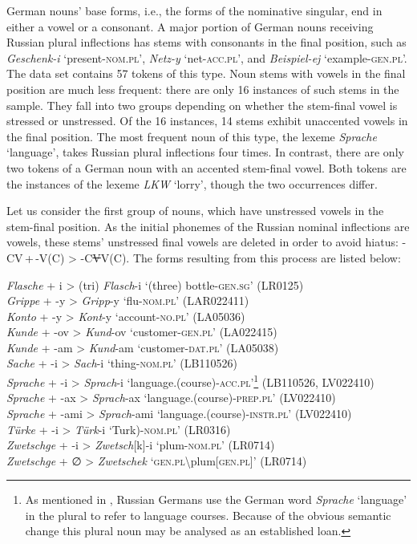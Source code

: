 \begin{sloppypar}
German nouns’ base forms, i.e., the forms of the nominative singular, end in either a vowel or a consonant. A major portion of German nouns receiving Russian plural inflections has stems with consonants in the final position, such as \textit{Geschenk-i} `present-\textsc{nom.pl}', \textit{Netz-y} `net-\textsc{acc.pl}', and \textit{Beispiel-ej} `example-\textsc{gen.pl}'. The data set contains 57 tokens of this type. Noun stems with vowels in the final position are much less frequent: there are only 16 instances of such stems in the sample. They fall into two groups depending on whether the stem-final vowel is  stressed or unstressed. Of the 16 instances, 14 stems exhibit unaccented vowels in the final  position. The most frequent noun of this type, the lexeme \textit{Sprache} `language', takes Russian plural inflections four times. In contrast, there are only two tokens of a German noun with an accented stem-final vowel. Both tokens are the instances of the lexeme \textit{LKW} `lorry', though the two occurrences differ.
\end{sloppypar}

Let us consider the first group of nouns, which have unstressed vowels in the stem-final position. As the initial phonemes of the Russian nominal inflections are vowels, these stems’ unstressed final vowels are deleted in order to avoid hiatus: -CV\,+\,-V(C) > -C\sout{V}V(C). The forms resulting from this process are listed below:

\ea
\label{ex:6:18}
\textit{Flasche} + i > (tri) \textit{Flasch}-i `(three) bottle-\textsc{gen.sg}' (LR0125)\\
\textit{Grippe} + -y > \textit{Gripp}-y `flu-\textsc{nom.pl}' (LAR022411)\\
\textit{Konto} + -y > \textit{Kont}-y `account-\textsc{no.pl}' (LA05036)\\
\textit{Kunde} + -ov > \textit{Kund}-ov `customer-\textsc{gen.pl}' (LA022415)\\ 
\textit{Kunde} + -am > \textit{Kund}-am `customer-\textsc{dat.pl}' (LA05038)\\
\textit{Sache} + -i > \textit{Sach}-i `thing-\textsc{nom.pl}' (LB110526)\\
\textit{Sprache} + -i > \textit{Sprach}-i `language.(course)-\textsc{acc.pl}'\footnote{As mentioned in , Russian Germans use the German word \textit{Sprache} ‘language’ in the plural to refer to language courses. Because of the obvious semantic change this plural noun may be analysed as an established loan.} (LB110526, LV022410)\\
\textit{Sprache} + -ax > \textit{Sprach}-ax `language.(course)-\textsc{prep.pl}' (LV022410)\\
\textit{Sprache} + -ami > \textit{Sprach}-ami `language.(course)-\textsc{instr.pl}' (LV022410)\\
\textit{Türke} + -i > \textit{Türk}-i `Turk)-\textsc{nom.pl}' (LR0316)\\
\textit{Zwetschge} + -i > \textit{Zwetsch}[k]-i `plum-\textsc{nom.pl}' (LR0714)\\
\textit{Zwetschge} + ∅{} > \textit{Zwetschek} `\textsc{gen.pl}\textbackslash plum[\textsc{gen.pl}]' (LR0714)\\
\z

